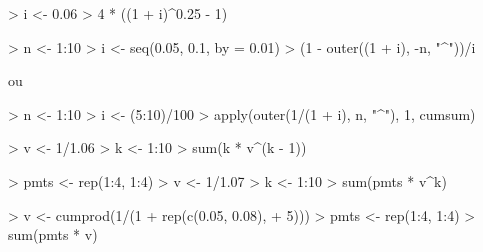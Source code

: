 \begin{reponse}{4.6}
\begin{Schunk}
\begin{Sinput}
> i <- 0.06
> 4 * ((1 + i)^0.25 - 1)
\end{Sinput}
\end{Schunk}
  
\end{reponse}
\begin{reponse}{4.7}
\begin{Schunk}
\begin{Sinput}
> n <- 1:10
> i <- seq(0.05, 0.1, by = 0.01)
> (1 - outer((1 + i), -n, "^"))/i
\end{Sinput}
\end{Schunk}
ou
\begin{Schunk}
\begin{Sinput}
> n <- 1:10
> i <- (5:10)/100
> apply(outer(1/(1 + i), n, "^"), 1, cumsum)
\end{Sinput}
\end{Schunk}
  
\end{reponse}
\begin{reponse}{4.8}
\begin{Schunk}
\begin{Sinput}
> v <- 1/1.06
> k <- 1:10
> sum(k * v^(k - 1))
\end{Sinput}
\end{Schunk}
  
\end{reponse}
\begin{reponse}{4.9}
\begin{Schunk}
\begin{Sinput}
> pmts <- rep(1:4, 1:4)
> v <- 1/1.07
> k <- 1:10
> sum(pmts * v^k)
\end{Sinput}
\end{Schunk}
  
\end{reponse}
\begin{reponse}{4.10}
\begin{Schunk}
\begin{Sinput}
> v <- cumprod(1/(1 + rep(c(0.05, 0.08),
+     5)))
> pmts <- rep(1:4, 1:4)
> sum(pmts * v)
\end{Sinput}
\end{Schunk}
  
\end{reponse}
